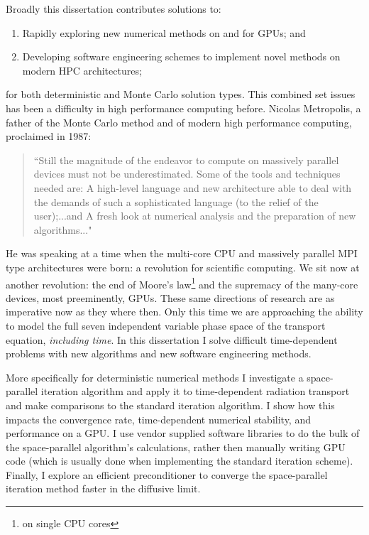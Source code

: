 Broadly this dissertation contributes solutions to:
\begin{enumerate}
    \item Rapidly exploring new numerical methods on and for GPUs; and
    \item Developing software engineering schemes to implement novel methods on modern HPC architectures;
\end{enumerate}
for both deterministic and Monte Carlo solution types.
This combined set issues has been a difficulty in high performance computing before.
Nicolas Metropolis, a father of the Monte Carlo method and of modern high performance computing, proclaimed in 1987:
\blockquote[\cite{metropolis_1987_history}][]{
``Still the magnitude of the endeavor to compute on massively parallel devices must not be underestimated. Some of the tools and techniques needed are: A high-level language and new architecture able to deal with the demands of such a sophisticated language (to the relief of the user);...and A fresh look at numerical analysis and the preparation of new algorithms..."
}
He was speaking at a time when the multi-core CPU and massively parallel MPI type architectures were born: a revolution for scientific computing.
We sit now at another revolution: the end of Moore's law\footnote{on single CPU cores} and the supremacy of the many-core devices, most preeminently, GPUs.
These same directions of research are as imperative now as they where then. 
Only this time we are approaching the ability to model the full seven independent variable phase space of the transport equation, \emph{including time}.
In this dissertation I solve difficult time-dependent problems with new algorithms and new software engineering methods.

More specifically for deterministic numerical methods I investigate a space-parallel iteration algorithm and apply it to time-dependent radiation transport and make comparisons to the standard iteration algorithm.
I show how this impacts the convergence rate, time-dependent numerical stability, and performance on a GPU.
I use vendor supplied software libraries to do the bulk of the space-parallel algorithm's calculations, rather then manually writing GPU code (which is usually done when implementing the standard iteration scheme).
Finally, I explore an efficient preconditioner to converge the space-parallel iteration method faster in the diffusive limit.

